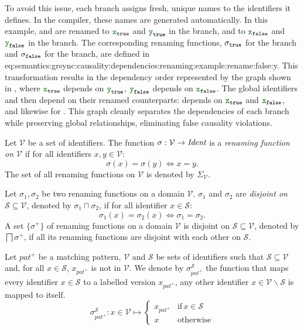To avoid this issue, each branch assigns fresh, unique names to the identifiers it defines. In the
compiler, these names are generated automatically. In this example,  and  are renamed
to $\idf{x}_\true$ and $\idf{y}_\true$ in the \true branch, and to
$\idf{x}_\false$ and $\idf{y}_\false$ in the \false branch.
%
The corresponding renaming functions, $\sigma_{\mathtt{{true}}}$ for the \true branch and
$\sigma_{\mathtt{{false}}}$ for the \false branch, are defined in
%
{eq:semantics:grsync:causality:dependencies:renaming:example:rename:false:y}.
%
This transformation results in the dependency order represented by the graph shown in
, where
$\idf{x}_\true$ depends on $\idf{y}_\true$,
$\idf{y}_\false$ depends on $\idf{x}_\false$.
%
The global identifiers  and  then depend on their renamed counterparts:
 depends on $\idf{x}_\true$ and $\idf{x}_\false$,
and likewise for .
%
This graph cleanly separates the dependencies of each branch while preserving global relationships,
eliminating false causality violations.

\begin{definition}
    \label{def:semantics:grsync:causality:dependencies:renaming}
    Let $\mathcal{V}$ be a set of identifiers.
    The function $\sigma: \mathcal{V} \rightarrow \textit{Ident}$ is a \emph{renaming function on
        $\mathcal{V}$} if for all identifiers $x, y \in \mathcal{V}$:
    $$\sigma(x) = \sigma(y) \Leftrightarrow x = y.$$
    The set of all renaming functions on $\mathcal{V}$ is denoted by $\Sigma_\mathcal{V}$.

    Let $\sigma_1, \sigma_2$ be two renaming functions on a domain $\mathcal{V}$.
    $\sigma_1$ and $\sigma_2$ are \emph{disjoint on $\mathcal{S} \subseteq \mathcal{V}$}, denoted by
    $\sigma_1 \sqcap \sigma_2$, if for all identifier $x \in \mathcal{S}$:
    $$\sigma_1(x) = \sigma_2(x) \Leftrightarrow \sigma_1 = \sigma_2.$$
    A set $\{\sigma^+\}$ of renaming functions on a domain $\mathcal{V}$ is disjoint on
    $\mathcal{S} \subseteq \mathcal{V}$, denoted by $\bigsqcap \sigma^+$, if all its renaming
    functions are disjoint with each other on $\mathcal{S}$.

    Let $pat^+$ be a matching pattern, $\mathcal{V}$ and $\mathcal{S}$ be sets of identifiers such that
    $\mathcal{S} \subseteq \mathcal{V}$ and, for all $x \in \mathcal{S}$, $x_{pat^+}$ is not in
    $\mathcal{V}$. We denote by $\sigma^{\mathcal{S}}_{pat^+}$ the function that maps every
    identifier $x \in \mathcal{S}$ to a labelled version $x_{pat^+}$, any other identifier
    $x \in \mathcal{V} \backslash \mathcal{S}$ is mapped to itself.
    $$\sigma^{\mathcal{S}}_{pat^+} : x \in \mathcal{V} \mapsto
        \left\{
        \begin{array}{ll}
            x_{pat^+} & \text{if} \, x \in \mathcal{S} \\
            x         & \text{otherwise}
        \end{array}
        \right.$$
\end{definition}

